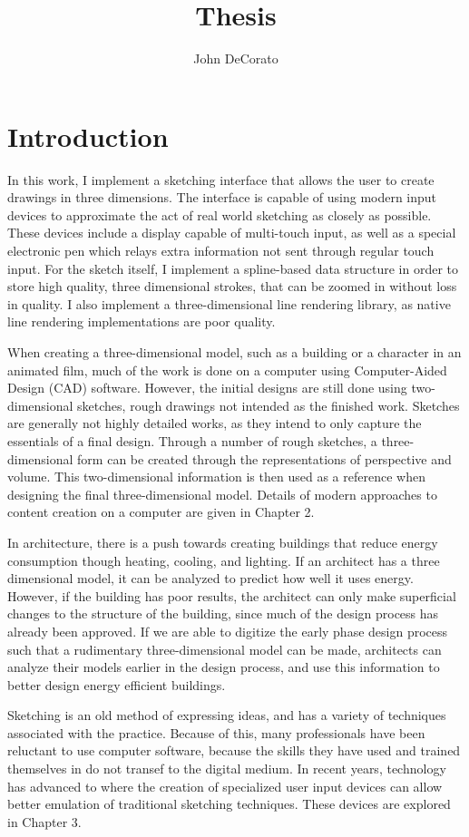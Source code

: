 \documentclass[11pt]{report}
\title{Thesis}
\author{John DeCorato}
\date{ }
\begin{document}
\chapter{Introduction}

In this work, I implement a sketching interface that allows the user to create drawings in three dimensions.
The interface is capable of using modern input devices to approximate the act of real world sketching as closely as possible.
These devices include a display capable of multi-touch input, as well as a special electronic pen which relays extra information
not sent through regular touch input.
For the sketch itself, I implement a spline-based data structure in order to store high quality, three dimensional strokes, that can be zoomed in without loss in quality.
I also implement a three-dimensional line rendering library, as native line rendering implementations are poor quality.

When creating a three-dimensional model, such as a building or a character in an animated film, much of the work is done on a computer using Computer-Aided Design (CAD) software.
However, the initial designs are still done using two-dimensional sketches, rough drawings not intended as the finished work.
Sketches are generally not highly detailed works, as they intend to only capture the essentials of a final design.
Through a number of rough sketches, a three-dimensional form can be created through the representations of perspective and volume.
This two-dimensional information is then used as a reference when designing the final three-dimensional model.
Details of modern approaches to content creation on a computer are given in Chapter 2.

In architecture, there is a push towards creating buildings that reduce energy consumption though heating, cooling, and lighting.
If an architect has a three dimensional model, it can be analyzed to predict how well it uses energy.
However, if the building has poor results, the architect can only make superficial changes to the structure of the building, since much of the design process has already been approved.
If we are able to digitize the early phase design process such that a rudimentary three-dimensional model can be made, architects can analyze their models earlier in the design process, and use this information to better design energy efficient buildings.

Sketching is an old method of expressing ideas, and has a variety of techniques associated with the practice.
Because of this, many professionals have been reluctant to use computer software, because the skills they have used and trained themselves in do not transef to the digital medium.
In recent years, technology has advanced to where the creation of specialized user input devices can allow better emulation of traditional sketching techniques.
These devices are explored in Chapter 3.
\end{document}
